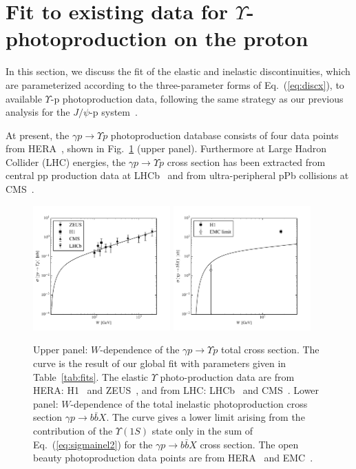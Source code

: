 \documentclass[prd,amsmath,%
twocolumn,floatfix,amssymb, preprintnumbers, nofootinbib, superscriptaddress]{revtex4}
\begin{document}
\section{Fit to existing data for $\Upsilon$-photoproduction on the proton}


In this section, we discuss the fit of the elastic and inelastic discontinuities, which are parameterized according to the three-parameter forms of Eq.~(\ref{eq:discx}), to available  $\Upsilon$-p photoproduction data, following the same strategy as our previous analysis for 
the $J/\psi$-p system~\cite{Gryniuk:2016mpk}. 
 
At present, the $\gamma p \to \Upsilon p$ photoproduction database consists of four data points from HERA~\cite{Adloff:2000vm,Breitweg:1998ki,Chekanov:2009zz}, shown in Fig.~\ref{fig:sigmatot} 
(upper panel). 
Furthermore at Large Hadron Collider (LHC) energies, the $\gamma p \to \Upsilon p$ cross section has been extracted from central pp production data at LHCb~\cite{Aaij:2015kea} 
and from ultra-peripheral pPb collisions at  CMS~\cite{Sirunyan:2018sav}.

\begin{figure}
\includegraphics[width=0.47\textwidth]{si_y.pdf}
\includegraphics[width=0.47\textwidth]{si_bbX.pdf}
\caption{Upper panel: $W$-dependence of the $\gamma p \to \Upsilon p$ total cross section.
The curve is the result of our global fit with parameters given in Table~\ref{tab:fits}.
The elastic $\Upsilon$ photo-production data are from HERA: H1~\cite{Adloff:2000vm}
and ZEUS~\cite{Breitweg:1998ki, Chekanov:2009zz}, and from LHC: LHCb~\cite{Aaij:2015kea} 
and CMS~\cite{Sirunyan:2018sav}. 
Lower panel: $W$-dependence of the 
total inelastic photoproduction cross section $\gamma p \to b \bar b X$.
The curve gives a lower limit arising from the contribution of the $\Upsilon(1S)$ state only in the sum of Eq.~(\ref{eq:sigmainel2}) for the $\gamma p \to b \bar b X$ cross section. 
The open beauty photoproduction data points are from HERA~\cite{Adloff:1999nr} and EMC~\cite{Aubert:1981gx}.}
\label{fig:sigmatot}
\end{figure}
\end{document}
